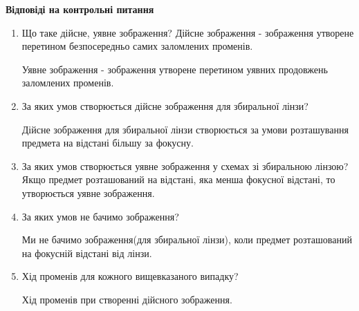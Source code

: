 \begin{center}
    \Large{\textbf{Відповіді на контрольні питання}}    
\end{center}

\vspace{1mm}

\begin{enumerate}
    \item Що таке дійсне, уявне зображення?  
    \bigbreak
    Дійсне зображення - зображення утворене перетином безпосередньо самих
    заломлених променів.

    Уявне зображення - зображення утворене перетином уявних продовжень
    заломлених променів.

    \item За яких умов створюється дійсне зображення для збиральної лінзи?
    \bigbreak
    
    Дійсне зображення для збиральної лінзи створюється за умови
    розташування предмета на відстані більшу за фокусну.

    \item За яких умов створюється уявне зображення у схемах зі збиральною лінзою?
    \bigbreak
    Якщо предмет розташований на відстані, яка менша фокусної відстані, то
    утворюється уявне зображення.

    \item За яких умов не бачимо зображення?
    \bigbreak

    Ми не бачимо зображення(для збиральної лінзи), коли
    предмет розташований на фокусній відстані від лінзи.

    \item Хід променів для кожного вищевказаного випадку?
    \bigbreak

    Хід променів при створенні дійсного зображення.


\end{enumerate}
